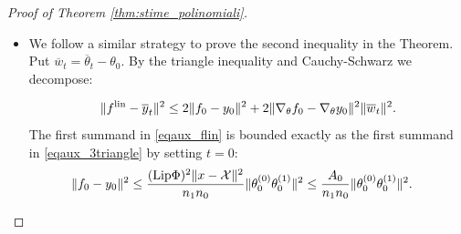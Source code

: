 \documentclass{article}
\theoremstyle{definition}
\theoremstyle{remark}
\numberwithin{equation}{section}
\newcommand{\X}{\mathcal{X}}
\newcommand{\s}{\psi}
\newcommand{\lin}{{\textup{lin}}}
\newcommand{\norm}[2]{
    \|#1\|_{#2}
}
\begin{document}
\begin{proof}[Proof of Theorem \ref{thm:stime_polinomiali}]
\begin{itemize}
        Hence,
        \begin{align}
            \label{eqaux_1stsum}
            \norm{y_t- f_t}{}^2 &\le \frac{(\textup{Lip}\Phi)^2\norm{x-\X}{}}{n_0n_1}\norm{\theta^{(0)}_t\theta^{(1)}_t}{}^2\\
            &\le \frac{A_0}{n_0}\norm{\theta^{(0)}_0\theta^{(1)}_0}{}^2 +\frac{A_1t^2}{n_0n_1}\norm{\theta^{(0)}_0}{}^2\s(\theta_0)^2 + \frac{A_2\norm{\theta^{(1)}_0}{}^2t^4}{n_1^2n_0}\s(\theta_0)^4 \\
            &\quad + \frac{A_3t^6}{n_1^2n_0}\s(\theta_0)^6 + \frac{A_4t^2}{n_1n_0}\norm{\theta^{(1)}_0}{}^4\s(\theta_0)^2 + \frac{A_5t^4\norm{\theta^{(1)}_0}{}^2}{n_1^2n_0}\s(\theta_0)^4.
        \end{align}
        with $A_0 = (\textup{Lip}\Phi)^2\norm{x-\X}{}^2$,
        $A_1 = a_1^2$, $A_2= a_0^2$, $A_3 = a_1^2a_0^2$, $A_4 = {a'}_0^2$ and $A_5 = {a'}_0^2a_1^2$.

\item We follow a similar strategy to prove the second inequality in the Theorem. 
Put $\overline w_t = \overline \theta_t - \theta_0$.
By the triangle inequality and Cauchy-Schwarz we decompose:

\begin{align}
    \label{eqaux_flin}
        \norm{f^\lin-\overline y_t}{}^2 \le 2\norm{f_0 - y_0}{}^2 + 2\norm{\nabla_\theta f_0 - \nabla_\theta y_0}{}^2\norm{\overline w_t}{}^2.
    \end{align}
    The first summand in \eqref{eqaux_flin} is bounded exactly as the first summand in \eqref{eqaux_3triangle} by setting $t=0$:
    \begin{align}
        \norm{f_0 - y_0}{}^2 &\le  \frac{(\textup{Lip}\Phi)^2 \norm{x-\X}{}^2}{n_1n_0} \norm{\theta_0^{(0)}\theta_0^{(1)} }{}^2 \le \frac{A_0}{n_1n_0}\norm{\theta_0^{(0)}\theta_0^{(1)} }{}^2.
    \end{align}


\end{itemize}
\end{proof}
\end{document}
